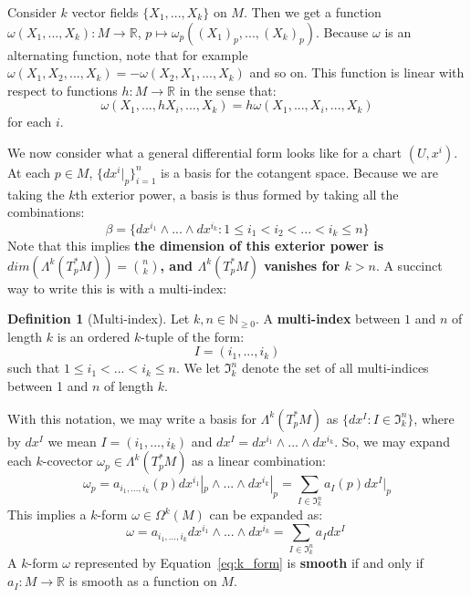 \documentclass[11pt, oneside]{article}   	%
\theoremstyle{definition}
\newtheorem{definition}{Definition}[section]
\begin{document}
Consider $k$ vector fields $\{X_1, ..., X_k\}$ on $M$. Then we 
get a function $\omega(X_1, ..., X_k) : M\rightarrow\mathbb R$, $p\mapsto \omega_p((X_1)_p, ..., (X_k)_p)$. Because 
$\omega$ is an alternating function, note that for example $\omega(X_1, X_2, ..., X_k) = -\omega(X_2, X_1, ..., X_k)$ and 
so on. This function is linear with respect to functions $h : M\rightarrow\mathbb R$ in the sense that:
\begin{equation}
	\omega(X_1, ..., hX_i, ..., X_k) = h\omega(X_1, ..., X_i, ..., X_k)
\end{equation}
for each $i$. 

We now consider what a general differential form looks like for a chart $(U, x^i)$. At each $p\in M$, $\{dx^i|_p\}_{i = 1}^n$ is a 
basis for the cotangent space. Because we are taking the $k$th exterior power, a basis is thus formed by taking all the 
combinations:
\begin{equation}
	\beta = \{dx^{i_1}\wedge ...\wedge dx^{i_k} : 1\leq i_1 < i_2 < ... < i_k \leq n\}
\end{equation}
Note that this implies \textbf{the dimension of this exterior power is $dim(\Lambda^k(T_p^* M)) = {n\choose k}$, and 
$\Lambda^k(T_p^* M)$ vanishes for $k > n$}. A succinct way to write this is with a multi-index:
\begin{definition}[Multi-index]
	Let $k, n\in\mathbb N_{\geq 0}$. A \textbf{multi-index} between $1$ and $n$ of length $k$ is an ordered $k$-tuple 
	of the form:
	\begin{equation}
		I = (i_1, ..., i_k)
	\end{equation}
	such that $1\leq i_1< ...< i_k\leq n$. We let $\mathfrak I_k^n$ denote the set of all multi-indices between 1 and $n$ of 
	length $k$. 
\end{definition}
With this notation, we may write a basis for $\Lambda^k(T_p^*M)$ as $\{dx^I : I\in\mathfrak I_k^n\}$, where by $dx^I$ we 
mean $I = (i_1, ..., i_k)$ and $dx^I = dx^{i_1}\wedge ...\wedge dx^{i_k}$. So, we may expand each $k$-covector $\omega_p
\in\Lambda^k(T_p^* M)$ as a linear combination:
\begin{equation}
	\omega_p = a_{i_1, ..., i_k}(p)dx^{i_1}|_p\wedge ...\wedge dx^{i_k}|_p = \sum_{I\in\mathfrak I_k^n} a_I(p) dx^I|_p
\end{equation}
This implies a $k$-form $\omega\in\Omega^k(M)$ can be expanded as:
\begin{equation}
	\omega = a_{i_1, ..., i_k}dx^{i_1}\wedge ...\wedge dx^{i_k} = \sum_{I\in\mathfrak I_k^n} a_I dx^I~
	\label{eq:k_form}
\end{equation}
A $k$-form $\omega$ represented by Equation~\ref{eq:k_form} is \textbf{smooth} if and only if $a_I : M\rightarrow\mathbb R$ 
is smooth as a function on $M$. 
\end{document}
